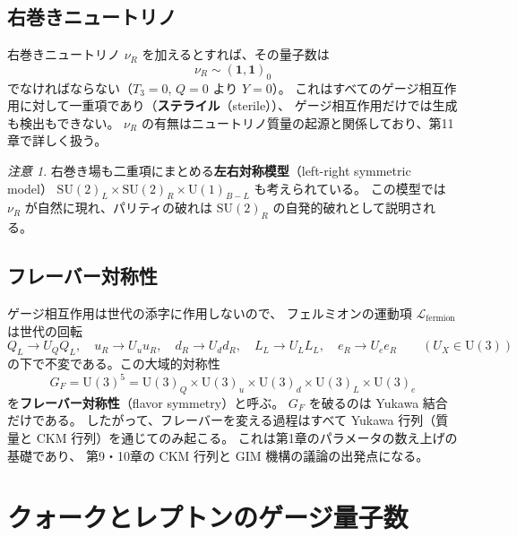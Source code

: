 \documentclass[uplatex,dvipdfmx,a4paper,11pt,openany]{jsbook}
\newcommand{\term}[2]{\textbf{#1}（#2）}
\numberwithin{equation}{chapter}
\theoremstyle{definition}
\theoremstyle{plain}
\theoremstyle{remark}
\newtheorem{remark}{注意}[chapter]
\newcommand{\Lag}{\mathcal{L}}
\newcommand{\SU}{\mathrm{SU}}
\newcommand{\U}{\mathrm{U}}
\begin{document}
\subsection{右巻きニュートリノ}
右巻きニュートリノ $\nu_R$ を加えるとすれば、その量子数は
\begin{equation}
\nu_R\sim(\mathbf1,\mathbf1)_0
\end{equation}
でなければならない（$T_3=0$, $Q=0$ より $Y=0$）。
これはすべてのゲージ相互作用に対して一重項であり（\term{ステライル}{sterile}）、
ゲージ相互作用だけでは生成も検出もできない。
$\nu_R$ の有無はニュートリノ質量の起源と関係しており、第11章で詳しく扱う。
\begin{remark}
右巻き場も二重項にまとめる\term{左右対称模型}{left-right symmetric model}
$\SU(2)_L\times\SU(2)_R\times\U(1)_{B-L}$ も考えられている。
この模型では $\nu_R$ が自然に現れ、パリティの破れは $\SU(2)_R$ の自発的破れとして説明される。
\end{remark}
\subsection{フレーバー対称性}
ゲージ相互作用は世代の添字に作用しないので、
フェルミオンの運動項 $\Lag_{\mathrm{fermion}}$ は世代の回転
\begin{equation}
Q_L\to U_QQ_L,\quad
u_R\to U_uu_R,\quad
d_R\to U_dd_R,\quad
L_L\to U_LL_L,\quad
e_R\to U_ee_R
\qquad(U_X\in\U(3))
\end{equation}
の下で不変である。この大域的対称性
\begin{equation}
G_F=\U(3)^5=\U(3)_Q\times\U(3)_u\times\U(3)_d\times\U(3)_L\times\U(3)_e
\end{equation}
を\term{フレーバー対称性}{flavor symmetry}と呼ぶ。
$G_F$ を破るのは Yukawa 結合だけである。
したがって、フレーバーを変える過程はすべて Yukawa 行列（質量と CKM 行列）を通じてのみ起こる。
これは第1章のパラメータの数え上げの基礎であり、
第9・10章の CKM 行列と GIM 機構の議論の出発点になる。
\section{クォークとレプトンのゲージ量子数}
\label{sec:quantum-numbers}
\end{document}
